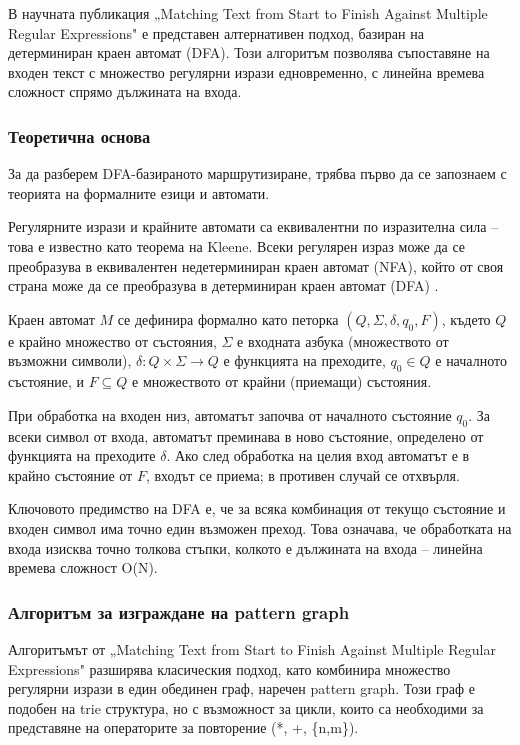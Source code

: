 В научната публикация „Matching Text from Start to Finish Against Multiple Regular Expressions" \cite{stankov2024regex} е представен алтернативен подход, базиран на детерминиран краен автомат (DFA). Този алгоритъм позволява съпоставяне на входен текст с множество регулярни изрази едновременно, с линейна времева сложност спрямо дължината на входа.

\subsubsection{Теоретична основа}

За да разберем DFA-базираното маршрутизиране, трябва първо да се запознаем с теорията на формалните езици и автомати.

Регулярните изрази и крайните автомати са еквивалентни по изразителна сила -- това е известно като теорема на Kleene. Всеки регулярен израз може да се преобразува в еквивалентен недетерминиран краен автомат (NFA), който от своя страна може да се преобразува в детерминиран краен автомат (DFA) \cite{rabin1959automata, thompson1968regex}.

Краен автомат $M$ се дефинира формално като петорка $(Q, \Sigma, \delta, q_0, F)$, където $Q$ е крайно множество от състояния, $\Sigma$ е входната азбука (множеството от възможни символи), $\delta: Q \times \Sigma \rightarrow Q$ е функцията на преходите, $q_0 \in Q$ е началното състояние, и $F \subseteq Q$ е множеството от крайни (приемащи) състояния.

При обработка на входен низ, автоматът започва от началното състояние $q_0$. За всеки символ от входа, автоматът преминава в ново състояние, определено от функцията на преходите $\delta$. Ако след обработка на целия вход автоматът е в крайно състояние от $F$, входът се приема; в противен случай се отхвърля.

Ключовото предимство на DFA е, че за всяка комбинация от текущо състояние и входен символ има точно един възможен преход. Това означава, че обработката на входа изисква точно толкова стъпки, колкото е дължината на входа -- линейна времева сложност O(N).

\subsubsection{Алгоритъм за изграждане на pattern graph}

Алгоритъмът от „Matching Text from Start to Finish Against Multiple Regular Expressions" \cite{stankov2024regex} разширява класическия подход, като комбинира множество регулярни изрази в един обединен граф, наречен pattern graph. Този граф е подобен на trie структура, но с възможност за цикли, които са необходими за представяне на операторите за повторение (*, +, \{n,m\}).

